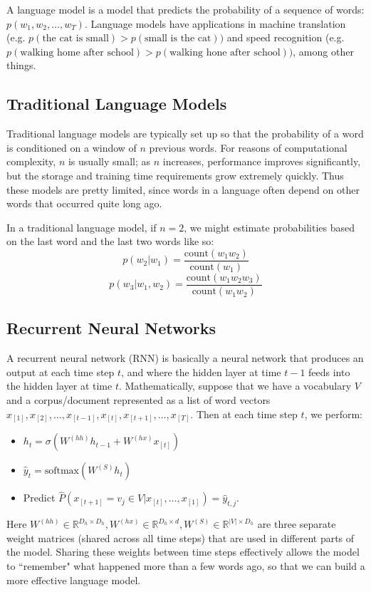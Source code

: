 A language model is a model that predicts the probability of a sequence of words: $p(w_1, w_2, \dots, w_T)$. Language models have applications in machine translation (e.g. $p(\text{the cat is small}) > p(\text{small is the cat}))$ and speed recognition (e.g. $p(\text{walking home after school}) > p(\text{walking hone after school}))$, among other things. 

\subsection{Traditional Language Models}
Traditional language models are typically set up so that the probability of a word is conditioned on a window of $n$ previous words. For reasons of computational complexity, $n$ is usually small; as $n$ increases, performance improves significantly, but the storage and training time requirements grow extremely quickly. Thus these models are pretty limited, since words in a language often depend on other words that occurred quite long ago.

In a traditional language model, if $n = 2$, we might estimate probabilities based on the last word and the last two words like so:
$$p(w_2 | w_1) = \frac{\text{count}(w_1w_2)}{\text{count}(w_1)}$$
$$p(w_3 | w_1, w_2) = \frac{\text{count}(w_1w_2w_3)}{\text{count}(w_1w_2)}$$

\subsection{Recurrent Neural Networks}
A recurrent neural network (RNN) is basically a neural network that produces an output at each time step $t$, and where the hidden layer at time $t-1$ feeds into the hidden layer at time $t$. Mathematically, suppose that we have a vocabulary $V$ and a corpus/document represented as a list of word vectors $x_{[1]}, x_{[2]}, \dots, x_{[t-1]}, x_{[t]}, x_{[t+1]}, \dots, x_{[T]}$. Then at each time step $t$, we perform:
\begin{itemize}
\item $h_t = \sigma(W^{(hh)}h_{t-1} + W^{(hx)}x_{[t]})$
\item $\hat{y}_t = \text{softmax}(W^{(S)}h_t)$
\item Predict $\hat{P}(x_{[t+1]} = v_j \in V | x_{[t]}, \dots, x_{[1]}) = \hat{y}_{t,j}$.
\end{itemize}
Here $W^{(hh)} \in \mathbb{R}^{D_h \times D_h}, W^{(hx)} \in \mathbb{R}^{D_h \times d}, W^{(S)} \in \mathbb{R}^{|V| \times D_h}$ are three separate weight matrices (shared across all time steps) that are used in different parts of the model. Sharing these weights between time steps effectively allows the model to ``remember" what happened more than a few words ago, so that we can build a more effective language model.

